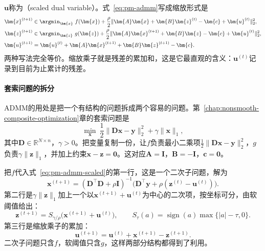 $\bm{u}$称为（scaled dual variable）。式~\eqref{eq:pm-admm}写成缩放形式是
\begin{equation}
 \begin{aligned}
 \bm{x}^{(t+1)}&\in\argmin_{\bm{x}}\ f(\bm{x})+\frac\rho2\lVert\bm{A}\bm{x}+\bm{B}\bm{z}^{(t)}-\bm{c}+\bm{u}^{(t)}\rVert_2^2,\\
 \bm{z}^{(t+1)}&\in\argmin_{\bm{z}}\ g(\bm{z})+\frac\rho2\lVert\bm{A}\bm{x}^{(t+1)}+\bm{B}\bm{z}-\bm{c}+\bm{u}^{(t)}\rVert_2^2,\\
 \bm{u}^{(t+1)}&=\bm{u}^{(t)}+\bm{A}\bm{x}^{(t+1)}+\bm{B}\bm{z}^{(t+1)}-\bm{c}.
 \end{aligned}
 \label{eq:pm-admm-scaled}
\end{equation}
两种写法完全等价。缩放乘子就是残差的累加和，这是它最直观的含义：$\bm{u}^{(t)}$记录到目前为止累计的残差。

\paragraph{套索问题的拆分}
ADMM的用处是把一个有结构的问题拆成两个容易的问题。第~\ref{chap:nonsmooth-composite-optimization}章的套索问题是
\begin{equation}
 \min_{\bm{x}}\ \frac12\lVert\bm{D}\bm{x}-\bm{y}\rVert_2^2+\gamma\lVert\bm{x}\rVert_1 ,
 \label{eq:pm-lasso}
\end{equation}
其中$\bm{D}\in\mathbb{R}^{N\times n}$，$\gamma>0$。把变量复制一份，让$f$负责最小二乘项$\tfrac12\lVert\bm{D}\bm{x}-\bm{y}\rVert_2^2$，$g$负责$\gamma\lVert\bm{z}\rVert_1$，并加上约束$\bm{x}-\bm{z}=\bm{0}$。这对应$\bm{A}=\bm{I}$，$\bm{B}=-\bm{I}$，$\bm{c}=\bm{0}$。

把$f$代入式~\eqref{eq:pm-admm-scaled}的第一行，这是一个二次子问题，解为
\begin{equation}
 \bm{x}^{(t+1)}=(\bm{D}^\top\bm{D}+\rho\bm{I})^{-1}\bigl(\bm{D}^\top\bm{y}+\rho(\bm{z}^{(t)}-\bm{u}^{(t)})\bigr).
 \label{eq:pm-lasso-x}
\end{equation}
第二行是$\gamma\lVert\bm{z}\rVert_1$加上一个以$\bm{x}^{(t+1)}+\bm{u}^{(t)}$为中心的二次项，按坐标可分，由软阈值给出：
\begin{equation}
 \bm{z}^{(t+1)}=S_{\gamma/\rho}\bigl(\bm{x}^{(t+1)}+\bm{u}^{(t)}\bigr),\qquad
 S_\tau(a)=\operatorname{sign}(a)\max\{\lvert a\rvert-\tau,0\}.
 \label{eq:pm-lasso-z}
\end{equation}
第三行是缩放乘子的累加：
\begin{equation}
 \bm{u}^{(t+1)}=\bm{u}^{(t)}+\bm{x}^{(t+1)}-\bm{z}^{(t+1)}.
 \label{eq:pm-lasso-u}
\end{equation}
二次子问题只含$f$，软阈值只含$g$，这样两部分结构都得到了利用。

